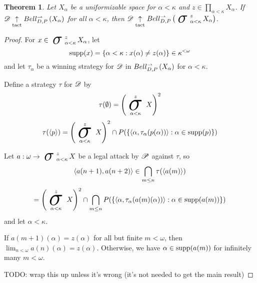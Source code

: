 \documentclass{amsart}
\newtheorem{theorem}{Theorem}[section]
\theoremstyle{definition}
\begin{document}
  \begin{theorem}
    Let \(X_\alpha\) be a uniformizable space for \(\alpha<\kappa\)
    and \(z\in \prod_{\alpha<\kappa}X_\alpha\).
    If
    \(\mathscr{D}\underset{\text{tact}}{\uparrow}Bell_{D,P}^{\rightharpoonup}\left({X_\alpha}\right)\) for all \(\alpha<\kappa\),
    then
    \(\pl D\tactwin\bellConGame{\sigmaProd_{\alpha<\kappa}^z X_\alpha}\).
  \end{theorem}

  \begin{proof}
    For \(x\in\sigmaProd_{\alpha<\kappa}^z X_\alpha\), let
      \[
        \textrm{supp}(x)
          =
        \left\{
          \alpha<\kappa
        :
          x(\alpha)\not=z(\alpha)
        \right\}
          \in
        \kappa^{<\omega}
      \]
    and let \(\tau_\alpha\) be a winning strategy for \(\mathscr{D}\) in
    \(Bell_{D,P}^{\rightharpoonup}\left({X_\alpha}\right)\) for \(\alpha<\kappa\).

    Define a strategy \(\tau\) for \(\mathscr{D}\) by
      \[
        \tau(\emptyset)
          =
        \left(\sigmaProd_{\alpha<\kappa}^z X\right)^2
      \]
      \[
        \tau(\<p\>)
          =
        \left(\sigmaProd_{\alpha<\kappa}^z X\right)^2
          \cap
        P(\{
          \<\alpha,\tau_\alpha(p(\alpha))\>
            :
          \alpha\in\supp(p)
        \})
      \]

    Let \(a:\omega\to \sigmaProd_{\alpha<\kappa}^z X\) be a legal
    attack by \(\mathscr{P}\) against \(\tau\), so
      \[
        \langle a(n+1),a(n+2)\rangle
          \in
        \bigcap_{m\leq n}
        \tau(\langle a(m)\rangle)
      \]
      \[
          =
        \left(\sigmaProd_{\alpha<\kappa}^z X\right)^2
          \cap
        \bigcap_{m\leq n}
        P(\{
          \<\alpha,\tau_\alpha(a(m)(\alpha))\>
            :
          \alpha\in\supp(a(m))
        \})
      \]
    and let \(\alpha<\kappa\).

    If \(a(m+1)(\alpha)=z(\alpha)\) for all but finite
    \(m<\omega\), then  \(\lim_{n<\omega}a(n)(\alpha)=z(\alpha)\).
    Otherwise, we have \(\alpha\in\textrm{supp}(a(m))\) for infinitely many
    \(m<\omega\).

    TODO: wrap this up unless it's wrong
    (it's not needed to get the
    main result)
  \end{proof}
\end{document}
